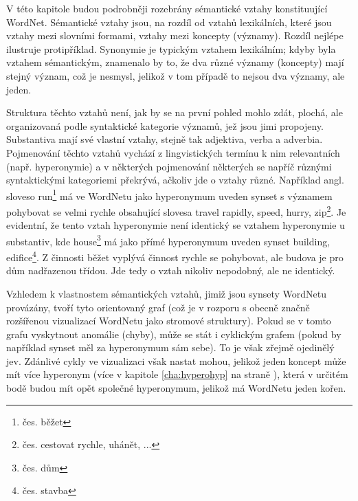 \documentclass[a4paper, 11pt, oneside]{book}
\newcommand\ex{\textsf}
\begin{document}



				V této kapitole budou podrobněji rozebrány sémantické vztahy konstituující WordNet. Sémantické vztahy jsou, na rozdíl od vztahů lexikálních, které jsou vztahy mezi slovními formami, vztahy mezi koncepty (významy). Rozdíl nejlépe ilustruje protipříklad. Synonymie je typickým vztahem lexikálním; kdyby byla vztahem sémantickým, znamenalo by to, že dva různé významy (koncepty) mají stejný význam, což je nesmysl, jelikož v tom případě to nejsou dva významy, ale jeden. 

				Struktura těchto vztahů není, jak by se na první pohled mohlo zdát, plochá, ale organizovaná podle syntaktické kategorie významů, jež jsou jimi propojeny. Substantiva mají své vlastní vztahy, stejně tak adjektiva, verba a adverbia. Pojmenování těchto vztahů vychází z lingvistických termínu k nim relevantních (např. \ex{hyperonymie}) a v některých pojmenování některých se napříč různými syntaktickými kategoriemi překrývá, ačkoliv jde o vztahy různé. Například angl. sloveso \ex{run}\footnote{čes. \ex{běžet}} má ve WordNetu jako \ex{hyperonymum} uveden synset s významem \ex{pohybovat se velmi rychle} obsahující slovesa \ex{travel rapidly, speed, hurry, zip}\footnote{čes. \ex{cestovat rychle, uhánět, ...}}. Je evidentní, že tento vztah hyperonymie není identický se vztahem hyperonymie u substantiv, kde \ex{house}\footnote{čes. \ex{dům}} má jako přímé hyperonymum uveden synset \ex{building, edifice}\footnote{čes. \ex{stavba}}. Z činnosti \ex{běžet} vyplývá činnost \ex{rychle se pohybovat}, ale \ex{budova} je pro \ex{dům} nadřazenou třídou. Jde tedy o vztah nikoliv nepodobný, ale ne identický. \parencite{princetonWN}

				Vzhledem k vlastnostem sémantických vztahů, jimiž jsou synsety WordNetu provázány, tvoří tyto orientovaný graf (což je v rozporu s obecně značně rozšířenou vizualizací WordNetu jako stromové struktury). Pokud se v tomto grafu vyskytnout anomálie (chyby), může se stát i cyklickým grafem (pokud by například synset měl za hyperonymum sám sebe). To je však zřejmě ojedinělý jev. \parencite{richens2008anomalies} Zdánlivé cykly ve vizualizaci však nastat mohou, jelikož jeden koncept může mít více hyperonym (více v kapitole \ref{cha:hyperohyp} na straně \pageref{cha:hyperohyp}), která v určitém bodě budou mít opět společné hyperonymum, jelikož má WordNetu jeden kořen.
\end{document}
